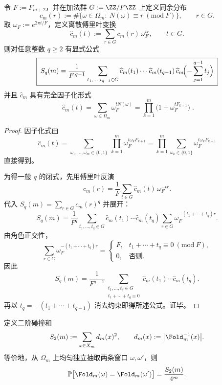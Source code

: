 \begin{proposition}\label{prop:pom-moment-fourier-q}
令 $F:=F_{m+2}$，并在加法群 $G:=\ZZ/F\ZZ$ 上定义同余分布
$$
c_m(r):=\#\{\omega\in\Omega_m:\ N(\omega)\equiv r\ (\mathrm{mod}\ F)\},\qquad r\in G.
$$
取 $\omega_F:=e^{2\pi i/F}$，定义离散傅里叶变换
$$
\widehat c_m(t):=\sum_{r\in G} c_m(r)\,\omega_F^{tr},\qquad t\in G.
$$
则对任意整数 $q\ge 2$ 有显式公式
$$
\boxed{\;
S_q(m)=\frac{1}{F^{\,q-1}}
\sum_{t_1,\dots,t_{q-1}\in G}
\widehat c_m(t_1)\cdots \widehat c_m(t_{q-1})\,
\widehat c_m\!\Bigl(-\sum_{j=1}^{q-1}t_j\Bigr)\;}
$$
并且 $\widehat c_m$ 具有完全因子化形式
$$
\boxed{\;
\widehat c_m(t)=\sum_{\omega\in\Omega_m}\omega_F^{tN(\omega)}
=\prod_{k=1}^m\bigl(1+\omega_F^{tF_{k+1}}\bigr)\; }.
$$
\end{proposition}
\begin{proof}
因子化式由
$$
\widehat c_m(t)=\sum_{\omega_1,\dots,\omega_m\in\{0,1\}}\ \prod_{k=1}^m \omega_F^{t\omega_kF_{k+1}}
=\prod_{k=1}^m\sum_{\omega_k\in\{0,1\}} \omega_F^{t\omega_kF_{k+1}}
$$
直接得到。

为得一般 $q$ 的闭式，先用傅里叶反演
$$
c_m(r)=\frac{1}{F}\sum_{t\in G}\widehat c_m(t)\,\omega_F^{-tr}.
$$
代入 $S_q(m)=\sum_{r\in G}c_m(r)^q$ 并展开：
$$
S_q(m)
=\frac{1}{F^q}\sum_{t_1,\dots,t_q\in G}\widehat c_m(t_1)\cdots\widehat c_m(t_q)\sum_{r\in G}\omega_F^{-(t_1+\cdots+t_q)r}.
$$
由角色正交性，
$$
\sum_{r\in G}\omega_F^{-(t_1+\cdots+t_q)r}
=
\begin{cases}
F,& t_1+\cdots+t_q\equiv 0\ (\mathrm{mod}\ F),\\
0,& \text{否则}.
\end{cases}
$$
因此
$$
S_q(m)=\frac{1}{F^{q-1}}\sum_{\substack{t_1,\dots,t_q\in G\\ t_1+\cdots+t_q\equiv 0}}
\widehat c_m(t_1)\cdots\widehat c_m(t_q).
$$
再以 $t_q=-(t_1+\cdots+t_{q-1})$ 消去约束即得所述公式。证毕。
\end{proof}

\begin{definition}[折叠碰撞矩]\label{def:pom-s2}
定义二阶碰撞和
$$
S_2(m):=\sum_{x\in X_m} d_m(x)^2,
\qquad d_m(x):=\bigl|\Fold_m^{-1}(x)\bigr|.
$$
等价地，从 \(\Omega_m\) 上均匀独立抽取两条窗口 \(\omega,\omega'\)，则
$$
\mathbb{P}\bigl[\Fold_m(\omega)=\Fold_m(\omega')\bigr]=\frac{S_2(m)}{4^m}.
$$
\end{definition}

